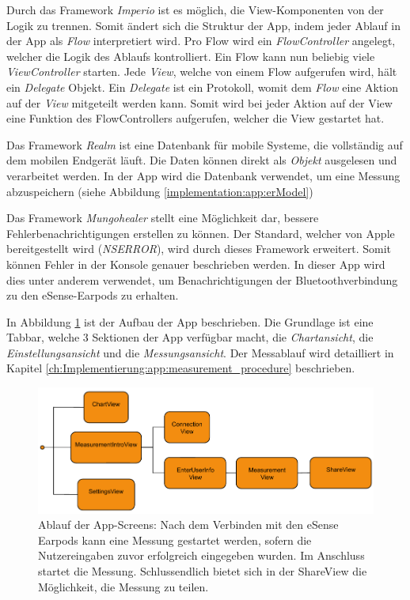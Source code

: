 Durch das Framework \textit{Imperio} ist es möglich, die View-Komponenten von der Logik zu trennen. 
Somit ändert sich die Struktur der App, indem jeder Ablauf in der App als \textit{Flow} interpretiert wird. 
Pro Flow wird ein \textit{FlowController} angelegt, welcher die Logik des Ablaufs kontrolliert. 
Ein Flow kann nun beliebig viele \textit{ViewController} starten.
Jede \textit{View}, welche von einem Flow aufgerufen wird, hält ein \textit{Delegate} Objekt.
Ein \textit{Delegate} ist ein Protokoll, womit dem \textit{Flow} eine Aktion auf der \textit{View} mitgeteilt werden kann.
Somit wird bei jeder Aktion auf der View eine Funktion des FlowControllers aufgerufen, welcher die View gestartet hat.

Das Framework \textit{Realm} ist eine Datenbank für mobile Systeme, die vollständig auf dem mobilen Endgerät läuft.
Die Daten können direkt als \textit{Objekt} ausgelesen und verarbeitet werden.
In der App wird die Datenbank verwendet, um eine Messung abzuspeichern (siehe Abbildung \ref{implementation:app:erModel})

Das Framework \textit{Mungohealer} stellt eine Möglichkeit dar, bessere Fehlerbenachrichtigungen erstellen zu können. 
Der Standard, welcher von Apple bereitgestellt wird (\textit{NSERROR}), wird durch dieses Framework erweitert.
Somit können Fehler in der Konsole genauer beschrieben werden. 
In dieser App wird dies unter anderem verwendet, um Benachrichtigungen der Bluetoothverbindung zu den eSense-Earpods zu erhalten.

In Abbildung \ref{systemdesign:appflow} ist der Aufbau der App beschrieben. 
Die Grundlage ist eine Tabbar, welche 3 Sektionen der App verfügbar macht, die \textit{Chartansicht}, die \textit{Einstellungsansicht} und die \textit{Messungsansicht}.
Der Messablauf wird detailliert in Kapitel \ref{ch:Implementierung:app:measurement_procedure} beschrieben.

\begin{figure}[h]
    \centering
    \includegraphics[width=1\textwidth]{images/study/AppAblauf.pdf}
  \caption{Ablauf der App-Screens: Nach dem Verbinden mit den eSense Earpods kann eine Messung gestartet werden, sofern die Nutzereingaben zuvor erfolgreich eingegeben wurden. Im Anschluss startet die Messung. Schlussendlich bietet sich in der ShareView die Möglichkeit, die Messung zu teilen.}
  \label{systemdesign:appflow}
 \end{figure}